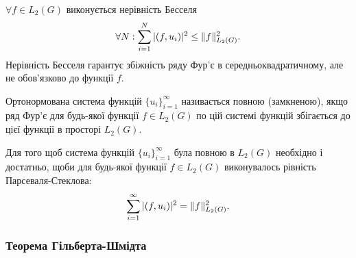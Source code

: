 $\forall f \in L_2(G)$ виконується нерівність Бесселя
\begin{equation}
	\label{eq:4.7}
	\forall N: \displaystyle\sum\limits_{i = 1}^N |(f, u_i)|^2 \le \|f\|_{L_2(G)}^2.
\end{equation}
Нерівність Бесселя гарантує збіжність ряду Фур'є в середньоквадратичному, але не обов'язково до функції $f$.

\begin{definition}
	Ортонормована система функцій $\{ u_i \}_{i = 1}^\infty$ називається повною (замкненою), якщо ряд Фур'є для будь-якої функції $f \in L_2(G)$ по цій системі функцій збігається до цієї функції в просторі $L_2(G)$.
\end{definition}
\begin{theorem}
	Для того щоб система функцій $\{ u_i \}_{i = 1}^\infty$ була повною в $L_2(G)$ необхідно і достатньо, щоби для будь-якої функції $f \in L_2(G)$ виконувалось рівність Парсеваля-Стеклова:
	\begin{equation}
		\label{eq:4.8}
		\displaystyle\sum\limits_{i = 1}^\infty |(f, u_i)|^2 = \|f\|_{L_2(G)}^2.
	\end{equation}
\end{theorem}

\subsubsection*{Теорема Гільберта-Шмідта}


